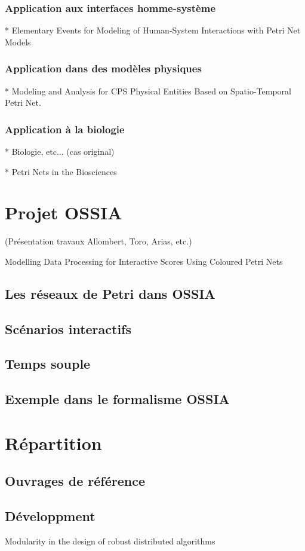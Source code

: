 \subsubsection{Application aux interfaces homme-système}
* Elementary Events for Modeling of Human-System Interactions with Petri Net Models
\subsubsection{Application dans des modèles physiques}
* Modeling and Analysis for CPS Physical Entities Based on Spatio-Temporal Petri Net.
\subsubsection{Application à la biologie}
* Biologie, etc... (cas original)

* Petri Nets in the Biosciences

\section{Projet OSSIA}
(Présentation travaux Allombert, Toro, Arias, etc.)

Modelling Data Processing for Interactive Scores Using Coloured Petri Nets
\subsection{Les réseaux de Petri dans OSSIA}
\subsection{Scénarios interactifs}
\subsection{Temps souple}
\subsection{Exemple dans le formalisme OSSIA}

\section{Répartition}
\subsection{Ouvrages de référence}
\cite{lynch1996distributed}

\subsection{Développment}
Modularity in the design of robust distributed algorithms

